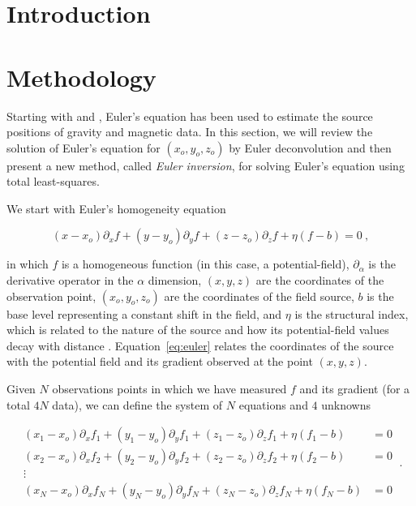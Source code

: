 \section{Introduction}


\section{Methodology}

Starting with \citet{Thompson1982} and \citet{Reid1990}, Euler's equation has
been used to estimate the source positions of gravity and magnetic data.
In this section, we will review the solution of Euler's equation for
$(x_o, y_o, z_o)$ by Euler deconvolution \citep{Reid1990} and then present a
new method, called \textit{Euler inversion}, for solving Euler's equation using
total least-squares.

We start with Euler's homogeneity equation

\begin{equation}
  (x - x_o)\partial_x f + (y - y_o)\partial_y f + (z - z_o)\partial_z f
  + \eta(f - b) = 0
  \ ,
  \label{eq:euler}
\end{equation}

\noindent
in which $f$ is a homogeneous function (in this case, a potential-field),
$\partial_\alpha$ is the derivative operator in the $\alpha$ dimension,
$(x, y, z)$ are the coordinates of the observation point,
$(x_o, y_o, z_o)$ are the coordinates of the field source,
$b$ is the base level representing a constant shift in the field,
and $\eta$ is the structural index, which is related to the nature of the
source and how its potential-field values decay with distance
\citep{Ruddock1966,Reid2014}.
Equation~\ref{eq:euler} relates the coordinates of the source with the
potential field and its gradient observed at the point $(x, y, z)$.

Given $N$ observations points in which we have measured $f$ and its gradient
(for a total $4N$ data), we can define the system of $N$ equations and $4$
unknowns

\begin{equation}
  \begin{aligned}
    (x_1-x_o)\partial_x f_1 + (y_1-y_o)\partial_y f_1 + (z_1-z_o)\partial_z f_1 + \eta(f_1-b) &= 0
    \\
    (x_2-x_o)\partial_x f_2 + (y_2-y_o)\partial_y f_2 + (z_2-z_o)\partial_z f_2 + \eta(f_2-b) &= 0
    \\
    \vdots
    \\
    (x_N-x_o)\partial_x f_N + (y_N-y_o)\partial_y f_N + (z_N-z_o)\partial_z f_N + \eta(f_N-b) &= 0
  \end{aligned}
  \ .
  \label{eq:euler-system}
\end{equation}

